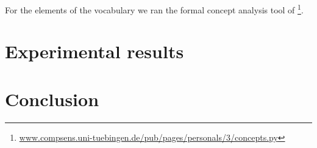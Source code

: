 \documentclass[11pt,a4paper]{article}
\begin{document}
For the elements of the vocabulary we ran the formal concept analysis tool of \citet{2010378} \footnote{\url{www.compsens.uni-tuebingen.de/pub/pages/personals/3/concepts.py}}.

\section{Experimental results}

\section{Conclusion}



\end{document}
